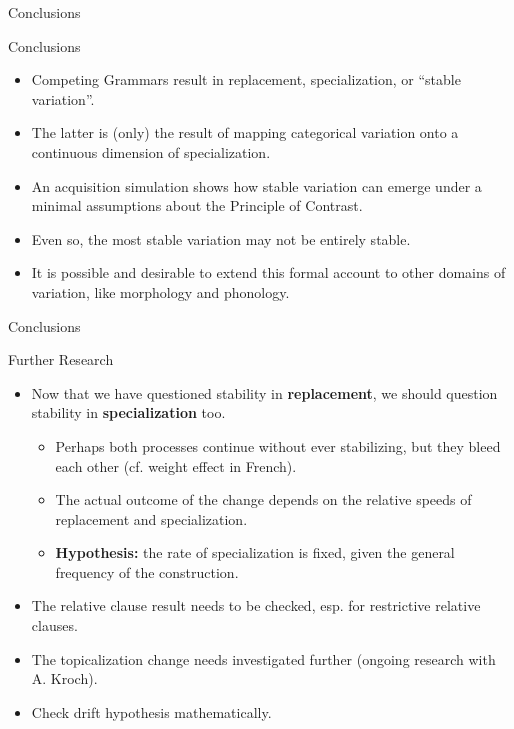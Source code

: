 \documentclass[hyperref={pdfpagelabels=false}]{beamer}
\begin{document}
\begin{frame}{Conclusions}
	\begin{block}{Conclusions}
		\begin{itemize}
			\item Competing Grammars result in replacement, specialization, or ``stable variation''.
			\item The latter is (only) the result of mapping categorical variation onto a continuous dimension of specialization.
			\item An acquisition simulation shows how stable variation can emerge under a minimal assumptions about the Principle of Contrast.
			\item Even so, the most stable variation may not be entirely stable.
			\item It is possible and desirable to extend this formal account to other domains of variation, like morphology and phonology.
		\end{itemize}
	\end{block}
	

\end{frame}

\begin{frame}{Conclusions}
	\begin{block}{Further Research}
		\begin{itemize}
			\item Now that we have questioned stability in \textbf{replacement}, we should question stability in \textbf{specialization} too.
				\begin{itemize}
					\item Perhaps both processes continue without ever stabilizing, but they bleed each other (cf. weight effect in French).
					\item The actual outcome of the change depends on the relative speeds of replacement and specialization.
					\item \textbf{Hypothesis:} the rate of specialization is fixed, given the general frequency of the construction.
				\end{itemize}
			\item The relative clause result needs to be checked, esp. for restrictive relative clauses.
			\item The topicalization change needs investigated further (ongoing research with A. Kroch).
			\item Check drift hypothesis mathematically.
				\end{itemize}
	\end{block}
\end{frame}
\end{document}
